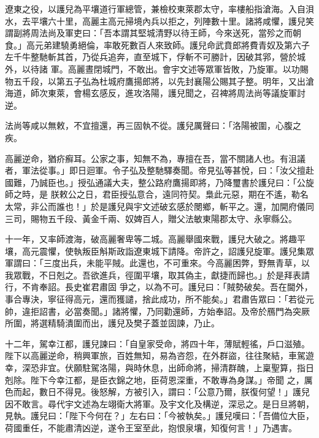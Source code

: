 \begin{pinyinscope}
 遼東之役，以護兒為平壤道行軍總管，兼檢校東萊郡太守，率樓船指滄海。入自浿水，去平壤六十里，高麗主高元掃境內兵以拒之，列陣數十里。諸將咸懼，護兒笑謂副將周法尚及軍吏曰：「吾本謂其堅城清野以待王師，今來送死，當殄之而朝食。」高元弟建驍勇絕倫，率敢死數百人來致師。護兒命武賁郎將費青奴及第六子左千牛整馳斬其首，乃從兵追奔，直至城下，俘斬不可勝計，因破其郛，營於城外，以待諸
 軍。高麗晝閉城門，不敢出。會宇文述等眾軍皆敗，乃旋軍。以功賜物五千段，以第五子弘為杜城府鷹揚郎將，以先封襄陽公賜其子整。明年，又出滄海道，師次東萊，會楊玄感反，進攻洛陽，護兒聞之，召裨將周法尚等議旋軍討逆。



 法尚等咸以無敕，不宜擅還，再三固執不從。護兒厲聲曰：「洛陽被圍，心腹之疾。



 高麗逆命，猶疥癬耳。公家之事，知無不為，專擅在吾，當不關諸人也。有沮議者，軍法從事。」即日迴軍。令子弘及整馳驛奏聞。帝見弘等甚悅，曰：「汝父擅赴國難，乃誠臣也。」授弘通議大夫，整公路府鷹揚即將，乃降璽書於護兒曰：「公旋師之時，是
 朕敕公之日，君臣授弘意合，遠同符契。梟此元惡，期在不遙，勒名太常，非公而誰也！」於是護兒與宇文述破玄感於閿鄉，斬平之。還，加開府儀同三司，賜物五千段、黃金千兩、奴婢百人，贈父法敏東陽郡太守、永寧縣公。



 十一年，又率師渡海，破高麗奢卑等二城。高麗舉國來戰，護兒大破之。將趣平壤，高元震懼，使執叛臣斛斯政詣遼東城下請降。帝許之，詔護兒旋軍。護兒集眾軍謂曰：「三度出兵，未能平賊。此還也，不可重來。今高麗困弊，野無青草，以我眾戰，不日剋之。吾欲進兵，徑圍平壤，取其偽主，獻捷而歸也。」於是拜表請行，不肯奉詔。長史崔君肅固
 爭之，以為不可。護兒曰：「賊勢破矣。吾在閫外，事合專決，寧征得高元，還而獲譴，捨此成功，所不能矣。」君肅告眾曰：「若從元帥，違拒詔書，必當奏聞。」諸將懼，乃同勸還師，方始奉詔。及帝於鴈門為突厥所圍，將選精騎潰圍而出，護兒及樊子蓋並固諫，乃止。



 十二年，駕幸江都，護兒諫曰：「自皇家受命，將四十年，薄賦輕徭，戶口滋殖。陛下以高麗逆命，稍興軍旅，百姓無知，易為咨怨，在外群盜，往往聚結，車駕遊幸，深恐非宜。伏願駐駕洛陽，與時休息，出師命將，掃清群醜，上稟聖算，指日剋除。陛下今幸江都，是臣衣錦之地，臣荷恩深重，不敢專為身謀。」帝聞
 之，厲色而起，數日不得見。後怒解，方被引入，謂曰：「公意乃爾，朕復何望！」護兒因不敢言。尋代宇文述為左翊衛大將軍。及宇文化及構逆，深忌之。是日旦將朝，見執。護兒曰：「陛下今何在？」左右曰：「今被執矣。」護兒嘆曰：「吾備位大臣，荷國重任，不能肅清凶逆，遂令王室至此，抱恨泉壤，知復何言！」乃遇害。




\end{pinyinscope}

